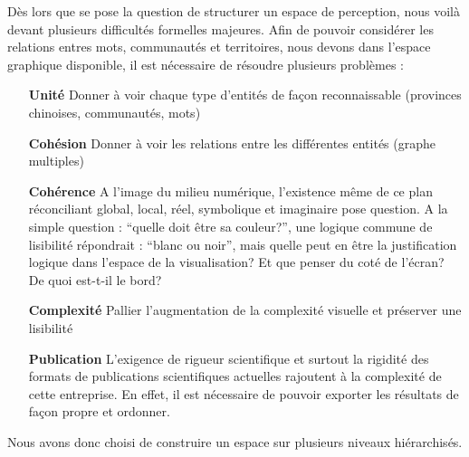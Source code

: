 Dès lors que se pose la question de structurer un espace de perception, nous voilà devant plusieurs difficultés formelles majeures. Afin de pouvoir considérer les relations entres mots, communautés et
territoires, nous devons dans l{\textquoteright}espace graphique
disponible, il est nécessaire de résoudre plusieurs problèmes :

\begin{itemize}
    \item[\textbf{Unité}] 
    Donner à voir chaque type d{\textquoteright}entités de fa\c{c}on reconnaissable (provinces chinoises, communautés, mots)

    \item[\textbf{Cohésion}] 
    Donner à voir les relations entre les différentes entités (graphe multiples)

    \item[\textbf{Cohérence}]
    A l{\textquoteright}image du milieu numérique, l{\textquoteright}existence même de ce plan réconciliant global, local, réel, symbolique et imaginaire pose question. A la simple question : {\textquotedblleft}quelle doit être sa couleur?{\textquotedblright}, une logique commune de lisibilité répondrait : {\textquotedblleft}blanc ou noir{\textquotedblright}, mais quelle peut en être la justification logique dans l{\textquoteright}espace de la visualisation? Et que penser du coté de l{\textquoteright}écran? De quoi est-t-il le bord?

    \item[\textbf{Complexité}] 
    Pallier l{\textquoteright}augmentation de la complexité visuelle et préserver une lisibilité

    \item[\textbf{Publication}]
    L{\textquoteright}exigence de rigueur scientifique et surtout la rigidité des formats de publications scientifiques actuelles rajoutent à la complexité de cette entreprise. En effet, il est nécessaire de pouvoir exporter les résultats de façon propre et ordonner.
\end{itemize} 

Nous avons donc choisi de construire un espace sur plusieurs niveaux hiérarchisés.

